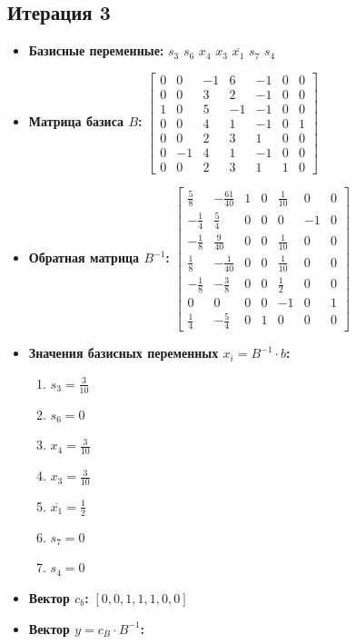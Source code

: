 \begin{itemize}
\subsection*{Итерация 3}
\begin{itemize}
\item \textbf{Базисные переменные:}
$s_3$
$s_6$
$x_4$
$x_3$
$\overline{x_1}$
$s_7$
$s_4$
\item \textbf{Матрица базиса $B$:}
$\left[\begin{matrix}0 & 0 & -1 & 6 & -1 & 0 & 0\\0 & 0 & 3 & 2 & -1 & 0 & 0\\1 & 0 & 5 & -1 & -1 & 0 & 0\\0 & 0 & 4 & 1 & -1 & 0 & 1\\0 & 0 & 2 & 3 & 1 & 0 & 0\\0 & -1 & 4 & 1 & -1 & 0 & 0\\0 & 0 & 2 & 3 & 1 & 1 & 0\end{matrix}\right]$
\item \textbf{Обратная матрица $B^{-1}$:}
$\left[\begin{matrix}\frac{5}{8} & - \frac{61}{40} & 1 & 0 & \frac{1}{10} & 0 & 0\\- \frac{1}{4} & \frac{5}{4} & 0 & 0 & 0 & -1 & 0\\- \frac{1}{8} & \frac{9}{40} & 0 & 0 & \frac{1}{10} & 0 & 0\\\frac{1}{8} & - \frac{1}{40} & 0 & 0 & \frac{1}{10} & 0 & 0\\- \frac{1}{8} & - \frac{3}{8} & 0 & 0 & \frac{1}{2} & 0 & 0\\0 & 0 & 0 & 0 & -1 & 0 & 1\\\frac{1}{4} & - \frac{5}{4} & 0 & 1 & 0 & 0 & 0\end{matrix}\right]$
\item \textbf{Значения базисных переменных $ x_i = B^{-1} \cdot b$:}
\begin{enumerate}
\item $s_3 = \frac{3}{10}$
\item $s_6 = 0$
\item $x_4 = \frac{3}{10}$
\item $x_3 = \frac{3}{10}$
\item $\overline{x_1} = \frac{1}{2}$
\item $s_7 = 0$
\item $s_4 = 0$
\end{enumerate}
\item \textbf{Вектор $c_b$:}
$[0, 0, 1, 1, 1, 0, 0]$
\item \textbf{Вектор $y = c_B \cdot B^{-1}$:}

\end{itemize}
\end{itemize}
